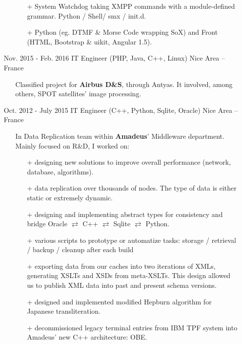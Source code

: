 \documentclass{res}
\begin{document}
\begin{resume}
\begin{itemize}
\begin{itemize}
\begin{itemize}
							\item[+] System Watchdog taking XMPP commands with a module-defined grammar. Python / Shell/ smx / init.d.
							\item[+] Python (eg. DTMF \& Morse Code wrapping SoX) and Front (HTML, Bootstrap \& uikit, Angular 1.5).
						\end{itemize}
					\end{itemize}
								\item[] Nov. 2015 - Feb. 2016 \tabto{5cm} IT Engineer (PHP, Java, C++, Linux) \hfill Nice Area -- France
												\begin{itemize}
																\item[] Classified project for \textbf{Airbus D\&S}, through Antyas. It involved, among others, SPOT satellites' image processing.
												\end{itemize}
                \item[] Oct. 2012 - July 2015 \tabto{5cm} IT Engineer (C++, Python, Sqlite, Oracle) \hfill Nice Area -- France
                \begin{itemize}
                        \item[] In Data Replication team within \textbf{Amadeus}' Middleware department. Mainly focused on R\&D, I worked on:
                        \begin{itemize}
                                \item[+] designing new solutions to improve overall performance (network, database, algorithms).
                                \item[+] data replication over thousands of nodes. The type of data is either static or extremely dynamic.
                                \item[+] designing and implementing abstract types for consistency and bridge Oracle $\rightleftarrows$ C++ $\rightleftarrows$ Sqlite $\rightleftarrows$ Python.
                                \item[+] various scripts to prototype or automatize tasks: storage / retrieval / backup / cleanup after each build\textellipsis
                                \item[+] exporting data from our caches into two iterations of XMLs, generating XSLTs and XSDs from meta-XSLTs. This design allowed us to publish XML data into past and present schema versions.
																\item[+] designed and implemented modified Hepburn algorithm for Japanese transliteration.
																\item[+] decommissioned legacy terminal entries from IBM TPF system into Amadeus' new C++ architecture: OBE.

\end{itemize}
\end{itemize}
\end{itemize}
\end{resume}
\end{document}
